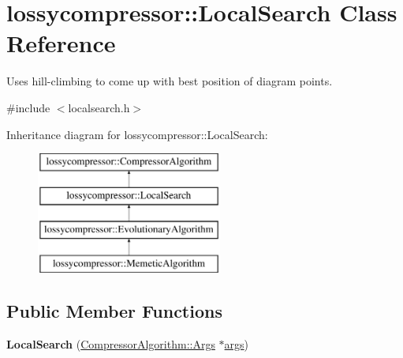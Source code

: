 \hypertarget{classlossycompressor_1_1_local_search}{}\section{lossycompressor\+:\+:Local\+Search Class Reference}
\label{classlossycompressor_1_1_local_search}


Uses hill-\/climbing to come up with best position of diagram points.  




{\ttfamily \#include $<$localsearch.\+h$>$}

Inheritance diagram for lossycompressor\+:\+:Local\+Search\+:\begin{figure}[H]
\begin{center}
\leavevmode
\includegraphics[height=4.000000cm]{classlossycompressor_1_1_local_search}
\end{center}
\end{figure}
\subsection*{Public Member Functions}
\begin{DoxyCompactItemize}
\item 
{\bfseries Local\+Search} (\hyperlink{structlossycompressor_1_1_compressor_algorithm_1_1_args}{Compressor\+Algorithm\+::\+Args} $\ast$\hyperlink{classlossycompressor_1_1_compressor_algorithm_a7cec23bc2a41ac35617e21466a2f0c46}{args})\hypertarget{classlossycompressor_1_1_local_search_a485d8d669395cf70638829f24dacea40}{}\label{classlossycompressor_1_1_local_search_a485d8d669395cf70638829f24dacea40}

\end{DoxyCompactItemize}
